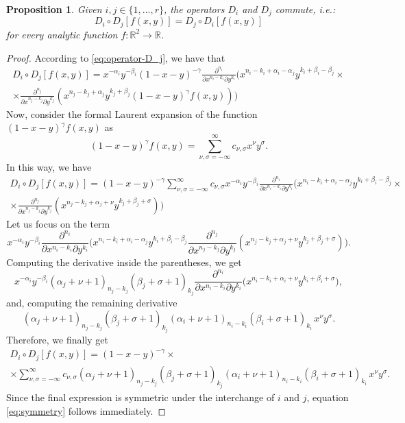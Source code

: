 \documentclass[11pt,reqno]{amsart}
\newcommand{\RR}{\mathbb{R}}
\newtheorem{proposition}[theorem]{Proposition}
\theoremstyle{definition}
\begin{document}
\begin{proposition}
    \label{propo:D_j-commute}
    Given $i,j\in \{1,\dots,r\}$, the operators $D_i$ and $D_{j}$ commute, \textit{i.e.}:
    \begin{equation}
        \label{eq:symmetry}
        D_i\circ D_j[f(x,y)] = D_j\circ D_i[f(x,y)] 
    \end{equation}
    for every analytic function $f:\RR^2\longrightarrow\RR$.
\end{proposition}
\begin{proof}
    According to \eqref{eq:operator-D_j}, we have that
    \begin{multline*}
         D_i\circ D_j[f(x,y)] = x^{-\alpha_i} y^{-\beta_i}(1-x-y)^{-\gamma} \frac{\partial^{n_i}}{\partial x^{n_i-k_i}\partial y^{k_i}}\Big(x^{n_i-k_i+\alpha_i-\alpha_j}y^{k_i+\beta_i-\beta_j} \times\\ \times \frac{\partial^{n_j}}{\partial x^{n_j-k_j}\partial y^{k_j}}\left(x^{n_j-k_j+\alpha_j}y^{k_j+\beta_j}(1-x-y)^{\gamma}f(x,y)\right)\Big)
    \end{multline*}
    Now, consider the formal Laurent expansion of the function $(1-x-y)^{\gamma}f(x,y)$ as
    \begin{equation}
        (1-x-y)^\gamma f(x,y)=\sum_{\nu,\sigma=-\infty}^{\infty} c_{\nu,\sigma}x^\nu y^\sigma.
    \end{equation}
    In this way, we have
    \begin{multline*}
        D_i\circ D_j[f(x,y)] =(1-x-y)^{-\gamma}\sum_{\nu,\sigma=-\infty}^{\infty} c_{\nu,\sigma} x^{-\alpha_i} y^{-\beta_i}  \frac{\partial^{n_i}}{\partial x^{n_i-k_i}\partial y^{k_i}}\Big(x^{n_i-k_i+\alpha_i-\alpha_j}y^{k_i+\beta_i-\beta_j} \times \\ \times  \frac{\partial^{n_j}}{\partial x^{n_j-k_j}\partial y^{k_j}}\left(x^{n_j-k_j+\alpha_j+\nu}y^{k_j+\beta_j+\sigma}\right)\Big)
    \end{multline*}
    Let us focus on the term
    $$
    x^{-\alpha_i} y^{-\beta_i}  \frac{\partial^{n_i}}{\partial x^{n_i-k_i}\partial y^{k_i}}\Big(x^{n_i-k_i+\alpha_i-\alpha_j}y^{k_i+\beta_i-\beta_j} \frac{\partial^{n_j}}{\partial x^{n_j-k_j}\partial y^{k_j}}\left(x^{n_j-k_j+\alpha_j+\nu}y^{k_j+\beta_j+\sigma}\right)\Big).
    $$
    Computing the derivative inside the parentheses, we get
    $$
    x^{-\alpha_i} y^{-\beta_i} (\alpha_j+\nu+1)_{n_j-k_j}(\beta_j+\sigma+1)_{k_j} \frac{\partial^{n_i}}{\partial x^{n_i-k_i}\partial y^{k_i}}\Big(x^{n_i-k_i+\alpha_i+\nu}y^{k_i+\beta_i+\sigma} \Big),
    $$
    and, computing the remaining derivative
    $$
    (\alpha_j+\nu+1)_{n_j-k_j}(\beta_j+\sigma+1)_{k_j}(\alpha_i+\nu+1)_{n_i-k_i}(\beta_i+\sigma+1)_{k_i}\, x^\nu y^\sigma.
    $$
    Therefore, we finally get
    \begin{multline}
    \label{eq:kampe}
         D_i\circ D_j[f(x,y)] = (1-x-y)^{-\gamma}\times  \\ \times \sum_{\nu,\sigma=-\infty}^{\infty} c_{\nu,\sigma} (\alpha_j+\nu+1)_{n_j-k_j}(\beta_j+\sigma+1)_{k_j}(\alpha_i+\nu+1)_{n_i-k_i}(\beta_i+\sigma+1)_{k_i}\, x^\nu y^\sigma .
    \end{multline}
    Since the final expression is symmetric under the interchange of $i$ and $j$, equation \eqref{eq:symmetry} follows immediately.


\end{proof}
\end{document}
